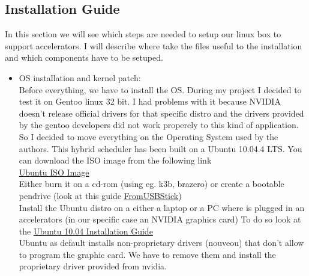 \documentclass[a4paper,13pt]{article}
\begin{document}
\vspace{20ex}
\begin{multicols}{2}

\subsection{Installation Guide}

In this section we will see which steps are needed to setup our linux box to support accelerators.
I will describe where take the files useful to the installation and which components have to be setuped.

\begin{itemize} 

    \item {OS installation and kernel patch:}\\
    Before everything, we have to install the OS. During my project I decided to test it on Gentoo linux 32 bit.
    I had problems with it because NVIDIA doesn't release official drivers for that specific distro and the drivers
    provided by the gentoo developers did not work properely to this kind of application. So I decided to move
    everything on the Operating System used by the authors.
    This hybrid scheduler has been built on a Ubuntu 10.04.4 LTS.
    You can download the ISO image from the following link\\
    \href{https://mega.co.nz/#!IodSWLZS!FHynfh_DNqm0Kb1rWb9ckX_uT68BPhaFthWQh34EuWk}{Ubuntu ISO Image}\\
    Either burn it on a cd-rom (using eg. k3b, brazero) or create a bootable pendrive (look at this guide \href{https://help.ubuntu.com/community/Installation/FromUSBStick}{FromUSBStick})\\
    Install the Ubuntu distro on a either a laptop or a PC where is plugged in an accelerators (in our specific case an NVIDIA graphics card)
    To do  so look at the \href{https://help.ubuntu.com/10.04/installation-guide/i386/}{Ubuntu 10.04 Installation Guide}\\
    Ubuntu as default installs non-proprietary drivers (nouveou) that don't allow to program the graphic card. We have to remove them and install the proprietary driver provided from nvidia.
\end{itemize}
\end{multicols}
\end{document}
